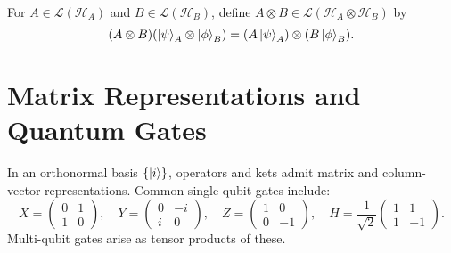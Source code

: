 \begin{definition}
	For $A\in\mathcal L(\mathcal H_A)$ and $B\in\mathcal L(\mathcal H_B)$, define $A\otimes B\in\mathcal L(\mathcal H_A\otimes\mathcal H_B)$ by
	\[ (A\otimes B)(\ket{\psi}_A\otimes\ket{\phi}_B) = (A\ket{\psi}_A)\otimes(B\ket{\phi}_B). \]
\end{definition}

\section{Matrix Representations and Quantum Gates}
In an orthonormal basis $\{\ket{i}\}$, operators and kets admit matrix and column-vector representations. Common single-qubit gates include:
\[
X=\begin{pmatrix}0 & 1\\1 & 0\end{pmatrix},\quad
Y=\begin{pmatrix}0 & -i\\i & 0\end{pmatrix},\quad
Z=\begin{pmatrix}1 & 0\\0 & -1\end{pmatrix},\quad
H=\frac1{\sqrt2}\begin{pmatrix}1 & 1\\1 & -1\end{pmatrix}.
\]
Multi-qubit gates arise as tensor products of these.
